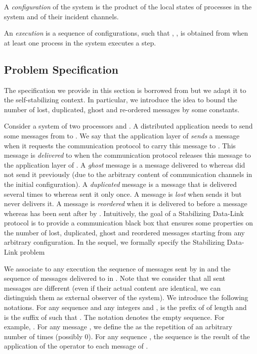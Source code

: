 \documentclass[11pt]{article}
\begin{document}
A \emph{configuration} of the system is the product of the local states of processes in the system and of their incident channels.

An {\em execution} is a sequence of configurations,  such that , , is obtained from  when at least one process in the system executes a step.

\subsection{Problem Specification}\label{sub:specification}

The specification we provide in this section is borrowed from \cite{L96b} but we adapt it to the self-stabilizing context. In particular, we introduce the idea to bound the number of lost, duplicated, ghost and re-ordered messages by some constants.

Consider a system of two processors  and . A distributed application needs to send some messages from  to . We say that the application layer of  \emph{sends} a message when it requests the communication protocol to carry this message to . This message is \emph{delivered} to  when the communication protocol releases this message to the application layer of . A \emph{ghost} message is a message delivered to  whereas  did not send it previously (due to the arbitrary content of communication channels in the initial configuration). A \emph{duplicated} message is a message that is delivered several times to  whereas  sent it only once. A message is \emph{lost} when  sends it but  never delivers it. A message  is \emph{reordered} when it is delivered to  before a message  whereas  has been sent after  by . Intuitively, the goal of a Stabilizing Data-Link protocol is to provide a communication black box that ensures some properties on the number of lost, duplicated, ghost and reordered messages starting from any arbitrary configuration. In the sequel, we formally specify the Stabilizing Data-Link problem

We associate to any execution  the sequence  of messages sent by  in  and the sequence  of messages delivered to  in . Note that we consider that all sent messages are different (even if their actual content are identical, we can distinguish them as external observer of the system). We introduce the following notations. For any sequence  and any integers  and ,  is the prefix of  of length  and  is the suffix of  such that . The notation  denotes the empty sequence. For example, . For any message , we define the  as the repetition of  an arbitrary number of times (possibly 0). For any sequence , the sequence  is the result of the application of the  operator to each message of . 
\end{document}
